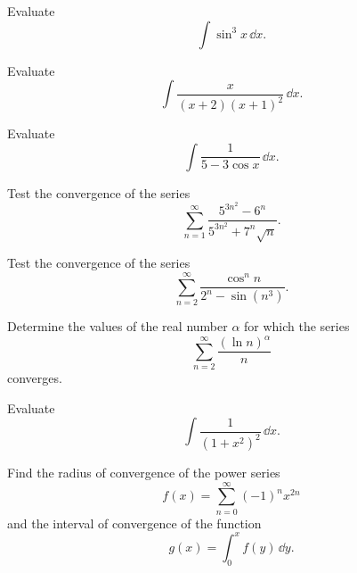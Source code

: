 
\schoolsection{\POSTECH}{\PohangUniversityOfScienceAndTechnology}

\begin{problem}
Evaluate
\[
\int \sin^3 x\,\dd x.
\]
\end{problem}

\begin{problem}
Evaluate
\[
\int \frac{x}{(x+2)(x+1)^2}\,\dd x.
\]
\end{problem}

\begin{problem}
Evaluate
\[
\int \frac{1}{5-3\cos x}\,\dd x.
\]
\end{problem}

\begin{problem}
Test the convergence of the series
\[
\sum_{n=1}^{\infty}
\frac{5^{3n^2}-6^n}{5^{3n^2}+7^n\sqrt n}.
\]
\end{problem}

\begin{problem}
Test the convergence of the series
\[
\sum_{n=2}^{\infty}
\frac{\cos^n n}{2^n-\sin(n^3)}.
\]
\end{problem}

\begin{problem}
Determine the values of the real number $\alpha$ for which the series
\[
\sum_{n=2}^{\infty}\frac{(\ln n)^\alpha}{n}
\]
converges.
\end{problem}

\begin{problem}
Evaluate
\[
\int \frac{1}{(1+x^2)^2}\,\dd x.
\]
\end{problem}

\begin{problem}
Find the radius of convergence of the power series
\[
f(x)=\sum_{n=0}^{\infty}(-1)^n x^{2n}
\]
and the interval of convergence of the function
\[
g(x)=\int_0^x f(y)\,\dd y.
\]
\end{problem}

